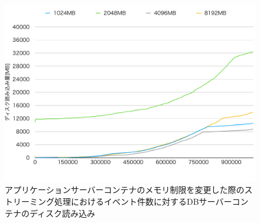 \documentclass[../../../../../main]{subfiles}
\begin{document}
    \begin{figure}[H]
        \centering
        \includegraphics[width=12cm]{graph}
        \caption{アプリケーションサーバーコンテナのメモリ制限を変更した際のストリーミング処理におけるイベント件数に対するDBサーバーコンテナのディスク読み込み}
        \label{fig:stream-change-app-memory-limit-db-disk-out-app_4_db_1_1024}
    \end{figure}
\end{document}
